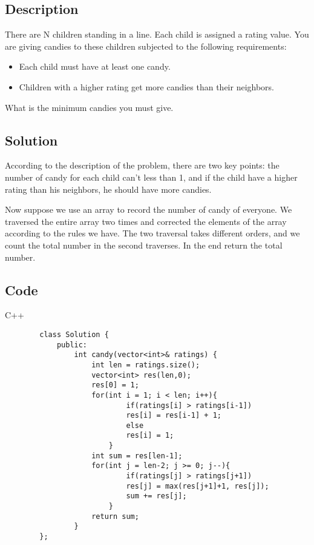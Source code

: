 \documentclass[10pt]{article}
\begin{document}
    \subsection*{Description}
        There are N children standing in a line. Each child is assigned a rating value. You are giving candies to these children subjected to the following requirements:
        \begin{itemize}
            \item Each child must have at least one candy.
            \item Children with a higher rating get more candies than their neighbors.
        \end{itemize}

        \noindent
        What is the minimum candies you must give.

    \subsection*{Solution}
        According to the description of the problem, there are two key points: the number of candy for each child can't less than 1, and if the child have a higher rating than his neighbors, he should have more candies.\vspace{2ex}
        
        \noindent
        Now suppose we use an array to record the number of candy of everyone. We traversed the entire array two times and corrected the elements of the array according to the rules we have. The two traversal takes different orders, and we count the total number in the second traverses. In the end return the total number.
    \subsection*{Code}
        C++
        \begin{lstlisting}
        class Solution {
            public:
                int candy(vector<int>& ratings) {
                    int len = ratings.size();
                    vector<int> res(len,0);
                    res[0] = 1;
                    for(int i = 1; i < len; i++){
                            if(ratings[i] > ratings[i-1])
                            res[i] = res[i-1] + 1;
                            else
                            res[i] = 1;
                        }
                    int sum = res[len-1];
                    for(int j = len-2; j >= 0; j--){
                            if(ratings[j] > ratings[j+1])
                            res[j] = max(res[j+1]+1, res[j]);
                            sum += res[j];
                        }
                    return sum;
                }
	    };
        \end{lstlisting}
\end{document}
